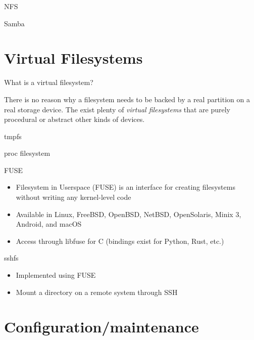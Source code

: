 \documentclass{lug}
\begin{document}
\begin{frame}{NFS}
\end{frame}

\begin{frame}{Samba}
\end{frame}

\section{Virtual Filesystems}
\begin{frame}{What is a virtual filesystem?}
\begin{center}
    There is no reason why a filesystem needs to be backed by a real partition
    on a real storage device. The exist plenty of \emph{virtual filesystems}
    that are purely procedural or abstract other kinds of devices.
\end{center}
\end{frame}

\begin{frame}{tmpfs}
\end{frame}

\begin{frame}{proc filesystem}
\end{frame}

\begin{frame}{FUSE}
\begin{itemize}
    \item Filesystem in Userspace (FUSE) is an interface for creating
    filesystems without writing any kernel-level code
    \item Available in Linux, FreeBSD, OpenBSD, NetBSD, OpenSolaris, Minix 3,
    Android, and macOS
    \item Access through libfuse for C (bindings exist for Python, Rust, etc.)
\end{itemize}
\end{frame}

\begin{frame}{sshfs}
\begin{itemize}
    \item Implemented using FUSE
    \item Mount a directory on a remote system through SSH
\end{itemize}
\end{frame}

\section{Configuration/maintenance}
\end{document}
